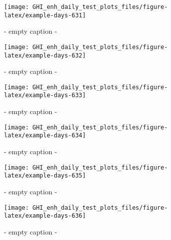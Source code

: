 \documentclass[
  10pt,
  a4paper,oneside]{article}
\begin{document}
\begin{figure}[H]

{\centering \texttt{[image: GHI\_enh\_daily\_test\_plots\_files/figure-latex/example-days-631]} 

}

\caption{ - empty caption - }\label{fig:example-days-631}
\end{figure}

\begin{figure}[H]

{\centering \texttt{[image: GHI\_enh\_daily\_test\_plots\_files/figure-latex/example-days-632]} 

}

\caption{ - empty caption - }\label{fig:example-days-632}
\end{figure}

\begin{figure}[H]

{\centering \texttt{[image: GHI\_enh\_daily\_test\_plots\_files/figure-latex/example-days-633]} 

}

\caption{ - empty caption - }\label{fig:example-days-633}
\end{figure}

\begin{figure}[H]

{\centering \texttt{[image: GHI\_enh\_daily\_test\_plots\_files/figure-latex/example-days-634]} 

}

\caption{ - empty caption - }\label{fig:example-days-634}
\end{figure}

\begin{figure}[H]

{\centering \texttt{[image: GHI\_enh\_daily\_test\_plots\_files/figure-latex/example-days-635]} 

}

\caption{ - empty caption - }\label{fig:example-days-635}
\end{figure}

\begin{figure}[H]

{\centering \texttt{[image: GHI\_enh\_daily\_test\_plots\_files/figure-latex/example-days-636]} 

}

\caption{ - empty caption - }\label{fig:example-days-636}
\end{figure}
\end{document}
